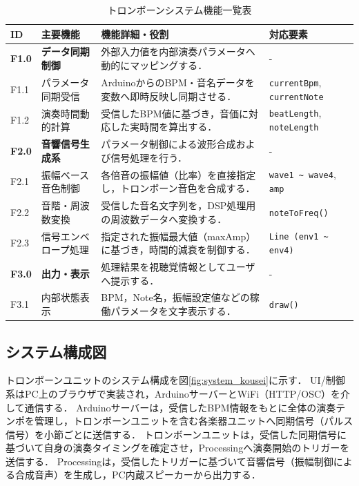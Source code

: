 \documentclass[uplatex,dvipdfmx]{jsarticle}
\begin{document}
\begin{table}[H]
\centering
\renewcommand{\arraystretch}{1.3} %
\small
\begin{tabularx}{\textwidth}{|l|>{\raggedright\arraybackslash}X|>{\raggedright\arraybackslash}X|>{\raggedright\arraybackslash}X|}
\hline
 \textbf{ID} & \textbf{主要機能} & \textbf{機能詳細・役割} & \textbf{対応要素} \\ \hline
 \textbf{F1.0} & \textbf{データ同期制御} & 外部入力値を内部演奏パラメータへ動的にマッピングする． & - \\ \hline
 F1.1 & パラメータ同期受信 & ArduinoからのBPM・音名データを変数へ即時反映し同期させる． & \texttt{currentBpm}, \texttt{currentNote} \\ \hline
 F1.2 & 演奏時間動的計算 & 受信したBPM値に基づき，音価に対応した実時間を算出する． & \texttt{beatLength}, \texttt{noteLength} \\ \hline
 \textbf{F2.0} & \textbf{音響信号生成系} & パラメータ制御による波形合成および信号処理を行う． & - \\ \hline
 F2.1 & 振幅ベース音色制御 & 各倍音の振幅値（比率）を直接指定し，トロンボーン音色を合成する． & \texttt{wave1 \~{} wave4}, \texttt{amp} \\ \hline
 F2.2 & 音階・周波数変換 & 受信した音名文字列を，DSP処理用の周波数データへ変換する． & \texttt{noteToFreq()} \\ \hline
 F2.3 & 信号エンベロープ処理 & 指定された振幅最大値（maxAmp）に基づき，時間的減衰を制御する． & \texttt{Line (env1 \~{} env4)} \\ \hline
 \textbf{F3.0} & \textbf{出力・表示} & 処理結果を視聴覚情報としてユーザへ提示する． & - \\ \hline
 F3.1 & 内部状態表示 & BPM，Note名，振幅設定値などの稼働パラメータを文字表示する． & \texttt{draw()} \\ \hline
\end{tabularx}
\caption{トロンボーンシステム機能一覧表}
\label{tab:functions}
\end{table}

\subsection{\textbf{システム構成図}}
トロンボーンユニットのシステム構成を図\ref{fig:system_kousei}に示す．
UI/制御系はPC上のブラウザで実装され，ArduinoサーバーとWiFi（HTTP/OSC）を介して通信する．
Arduinoサーバーは，受信したBPM情報をもとに全体の演奏テンポを管理し，トロンボーンユニットを含む各楽器ユニットへ同期信号（パルス信号）を小節ごとに送信する．
トロンボーンユニットは，受信した同期信号に基づいて自身の演奏タイミングを確定させ，Processingへ演奏開始のトリガーを送信する．
Processingは，受信したトリガーに基づいて音響信号（振幅制御による合成音声）を生成し，PC内蔵スピーカーから出力する．
\end{document}
